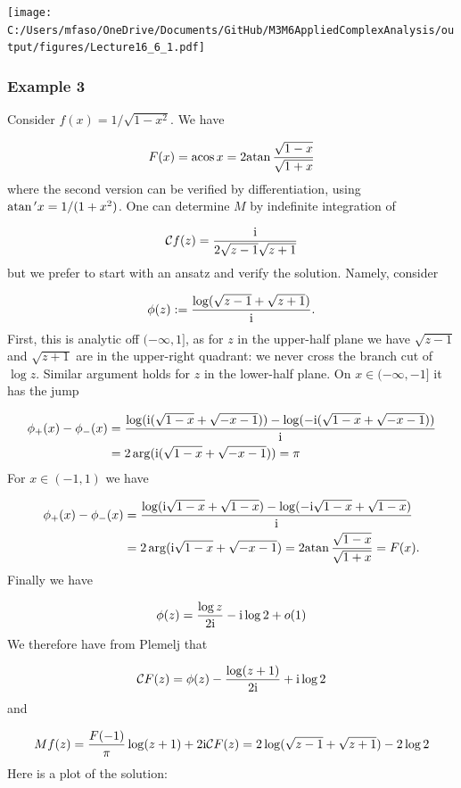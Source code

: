 \documentclass[12pt,landscape]{article}
\def\I{ {\rm i} }
\def\CC{ {\cal C} }
\def\acos{ {\rm acos}\, }
\def\atan{ {\rm atan}\, }
\begin{document}
{\texttt{[image: C:/Users/mfaso/OneDrive/Documents/GitHub/M3M6AppliedComplexAnalysis/output/figures/Lecture16\_6\_1.pdf]}

\subsubsection{Example 3}
Consider $f(x) = 1/\sqrt{1-x^2}$. We have

\[
F(x) = \acos x = 2 \atan {\sqrt{1-x} \over \sqrt{1+x}}
\]
where the second version can be verified by differentiation, using $\atan' x = 1/(1+x^2)$. One can determine $M$ by indefinite integration of

\[
\CC f(z) = {\I \over 2 \sqrt{z-1}\sqrt{z+1}}
\]
but we prefer to start with an ansatz and verify the solution. Namely, consider

\[
\phi(z) := {\log(\sqrt{z-1} + \sqrt{z+1}) \over \I}.
\]
First, this is analytic off $(-\infty,1]$, as for $z$ in the upper-half plane we have $\sqrt{z-1}$ and $\sqrt{z+1}$ are  in the upper-right quadrant: we never cross the branch cut of $\log z$. Similar argument holds for $z$ in the lower-half plane. On $x \in (-\infty,-1]$ it has the jump


\begin{align*}
\phi_+(x) - \phi_-(x) &= {\log(\I (\sqrt{1-x} + \sqrt{-x-1})) -  \log(-\I (\sqrt{1-x} + \sqrt{-x-1})) \over \I} \\
& =
        2 \arg(\I (\sqrt{1-x} + \sqrt{-x-1})) = \pi
\end{align*}
For $x \in (-1,1)$ we have


\begin{align*}
\phi_+(x) - \phi_-(x) &= {\log(\I \sqrt{1-x} + \sqrt{1-x}) -  \log(-\I \sqrt{1-x} + \sqrt{1-x}) \over \I} \\
& =
        2 \arg(\I \sqrt{1-x} + \sqrt{-x-1}) = 2 \atan {\sqrt{1-x} \over \sqrt{1+x}} = F(x).
\end{align*}
Finally we have

\[
\phi(z) = {\log z \over 2 \I} - \I \log 2 + o(1)
\]
We therefore have from Plemelj that

\[
\CC F(z) = \phi(z) - {\log(z+1) \over 2 \I} + \I \log 2
\]
and

\[
Mf(z) = {F(-1)\over \pi} \log(z+1)  + 2 \I \CC F(z) =2\log(\sqrt{z-1} + \sqrt{z+1}) -2 \log 2
\]
Here is a plot of the solution:


}
\end{document}

